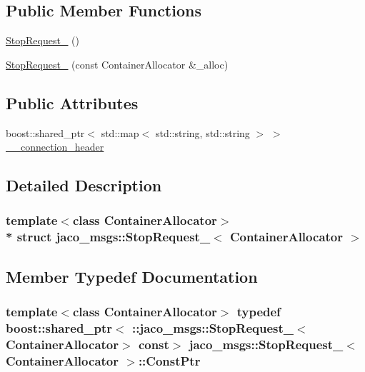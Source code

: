 \subsection*{Public Member Functions}
\begin{DoxyCompactItemize}
\item 
\hyperlink{structjaco__msgs_1_1StopRequest___abb8615bb2d838799de21b5af9840afdc}{Stop\+Request\+\_\+} ()
\item 
\hyperlink{structjaco__msgs_1_1StopRequest___afb2fee4be2e99a39dc69999a3c5e3406}{Stop\+Request\+\_\+} (const Container\+Allocator \&\+\_\+alloc)
\end{DoxyCompactItemize}
\subsection*{Public Attributes}
\begin{DoxyCompactItemize}
\item 
boost\+::shared\+\_\+ptr$<$ std\+::map$<$ std\+::string, std\+::string $>$ $>$ \hyperlink{structjaco__msgs_1_1StopRequest___ae56763abad909a6984c841f2aaee9590}{\+\_\+\+\_\+connection\+\_\+header}
\end{DoxyCompactItemize}


\subsection{Detailed Description}
\subsubsection*{template$<$class Container\+Allocator$>$\\*
struct jaco\+\_\+msgs\+::\+Stop\+Request\+\_\+$<$ Container\+Allocator $>$}



\subsection{Member Typedef Documentation}
\subsubsection[{\texorpdfstring{Const\+Ptr}{ConstPtr}}]{\setlength{\rightskip}{0pt plus 5cm}template$<$class Container\+Allocator$>$ typedef boost\+::shared\+\_\+ptr$<$ \+::{\bf jaco\+\_\+msgs\+::\+Stop\+Request\+\_\+}$<$Container\+Allocator$>$ const$>$ {\bf jaco\+\_\+msgs\+::\+Stop\+Request\+\_\+}$<$ Container\+Allocator $>$\+::{\bf Const\+Ptr}}\hypertarget{structjaco__msgs_1_1StopRequest___a8b4d8e02d8ae83d158cea49a234a07ff}{}\label{structjaco__msgs_1_1StopRequest___a8b4d8e02d8ae83d158cea49a234a07ff}

